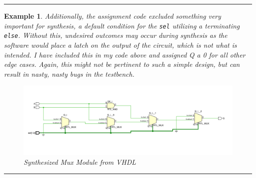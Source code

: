 \documentclass[12pt]{article}
\newtheorem{example}{Example}
\newenvironment{examp}
{
	\vspace{.5cm}
	\hrule
\begin{example}\upshape}
	{\hrule
		\vspace{0.5cm}
\end{example}}
\begin{document}
\begin{examp}
	Additionally, the assignment code excluded something very important for
	synthesis, a default condition for the \texttt{sel} utilizing a terminating
	\texttt{else}. Without this, undesired outcomes may occur during synthesis as
	the software would place a latch on the output of the circuit, which is not
	what is intended. I have included this in my code above and assigned Q a 0 for
	all other edge cases. Again, this might not be pertinent to such a simple
	design, but can result in nasty, nasty bugs in the testbench.
	\begin{figure}[H]
		\centering
		\includegraphics[scale=.35]{examp124}
		\caption{Synthesized Mux Module from VHDL}
	\end{figure}
\end{examp}
\end{document}
